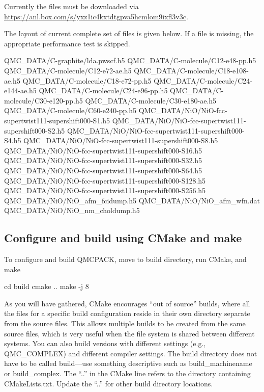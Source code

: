 Currently the files must be downloaded via \\
\url{https://anl.box.com/s/yxz1ic4kxtdtgpva5hcmlom9ixfl3v3c}.

The layout of current complete set of files is given below. If a file is missing, the appropriate performance test is skipped.
%
\begin{shade}
QMC_DATA/C-graphite/lda.pwscf.h5
QMC_DATA/C-molecule/C12-e48-pp.h5 
QMC_DATA/C-molecule/C12-e72-ae.h5 
QMC_DATA/C-molecule/C18-e108-ae.h5
QMC_DATA/C-molecule/C18-e72-pp.h5 
QMC_DATA/C-molecule/C24-e144-ae.h5
QMC_DATA/C-molecule/C24-e96-pp.h5 
QMC_DATA/C-molecule/C30-e120-pp.h5
QMC_DATA/C-molecule/C30-e180-ae.h5
QMC_DATA/C-molecule/C60-e240-pp.h5
QMC_DATA/NiO/NiO-fcc-supertwist111-supershift000-S1.h5
QMC_DATA/NiO/NiO-fcc-supertwist111-supershift000-S2.h5
QMC_DATA/NiO/NiO-fcc-supertwist111-supershift000-S4.h5
QMC_DATA/NiO/NiO-fcc-supertwist111-supershift000-S8.h5
QMC_DATA/NiO/NiO-fcc-supertwist111-supershift000-S16.h5
QMC_DATA/NiO/NiO-fcc-supertwist111-supershift000-S32.h5
QMC_DATA/NiO/NiO-fcc-supertwist111-supershift000-S64.h5
QMC_DATA/NiO/NiO-fcc-supertwist111-supershift000-S128.h5
QMC_DATA/NiO/NiO-fcc-supertwist111-supershift000-S256.h5
QMC_DATA/NiO/NiO_afm_fcidump.h5
QMC_DATA/NiO/NiO_afm_wfn.dat
QMC_DATA/NiO/NiO_nm_choldump.h5
\end{shade}


\subsection{Configure and build using CMake and make}
To configure and build QMCPACK, move to build directory, run CMake, and make

\begin{shade}
cd build
cmake ..
make -j 8
\end{shade}

As you will have gathered, CMake encourages ``out of source'' builds,
where all the files for a specific build configuration reside in their
own directory separate from the source files. This allows multiple
builds to be created from the same source files, which is very useful
when the file system is shared between different systems. You can also
build versions with different settings (e.g., QMC\_COMPLEX) and
different compiler settings. The build directory does not have to be
called build---use something descriptive such as build\_machinename or
build\_complex. The ``..'' in the CMake line refers to the directory
containing CMakeLists.txt. Update the ``..'' for other build
directory locations.

